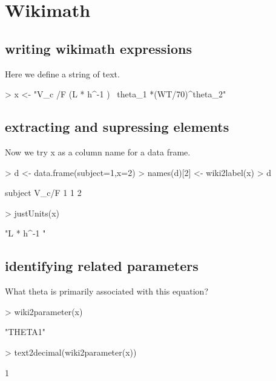 \documentclass[titlepage]{article}
\begin{document}

\section*{Wikimath}
\subsection{writing wikimath expressions}
Here we define a string of text.
\begin{Schunk}
\begin{Sinput}
> x <- "V_c /F (L * h^-1 ) ~theta_1 *(WT/70)^theta_2"
\end{Sinput}
\end{Schunk}
\subsection{extracting and supressing elements}
Now we try x as a column name for a data frame.
\begin{Schunk}
\begin{Sinput}
> d <- data.frame(subject=1,x=2)
> names(d)[2] <- wiki2label(x)
> d
\end{Sinput}
\begin{Soutput}
  subject V_c/F
1       1     2
\end{Soutput}
\begin{Sinput}
> justUnits(x)
\end{Sinput}
\begin{Soutput}
[1] "L * h^-1 "
\end{Soutput}
\end{Schunk}
\subsection{identifying related parameters}
What theta is primarily associated with this equation?
\begin{Schunk}
\begin{Sinput}
> wiki2parameter(x)
\end{Sinput}
\begin{Soutput}
[1] "THETA1"
\end{Soutput}
\begin{Sinput}
> text2decimal(wiki2parameter(x))
\end{Sinput}
\begin{Soutput}
[1] 1
\end{Soutput}
\end{Schunk}
\end{document}
